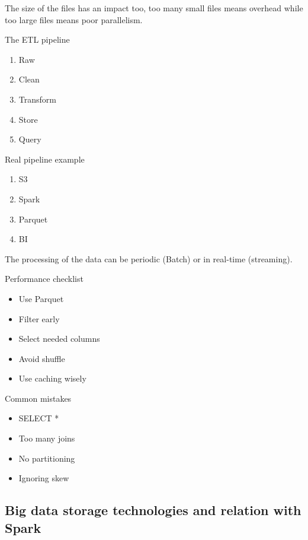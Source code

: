 The size of the files has an impact too, too many small files means overhead while too large files means poor parallelism.

\vspace{10pt}

The ETL pipeline 

\begin{enumerate}
    \item Raw
    \item Clean
    \item Transform
    \item Store
    \item Query
\end{enumerate}

Real pipeline example

\begin{enumerate}
    \item S3
    \item Spark
    \item Parquet
    \item BI
\end{enumerate}

The processing of the data can be periodic (Batch) or in real-time (streaming).

\vspace{10pt}

Performance checklist

\begin{itemize}
    \item Use Parquet
    \item Filter early
    \item Select needed columns
    \item Avoid shuffle
    \item Use caching wisely
\end{itemize}

Common mistakes

\begin{itemize}
    \item SELECT *
    \item Too many joins
    \item No partitioning
    \item Ignoring skew
\end{itemize}

\subsection{Big data storage technologies and relation with Spark}


